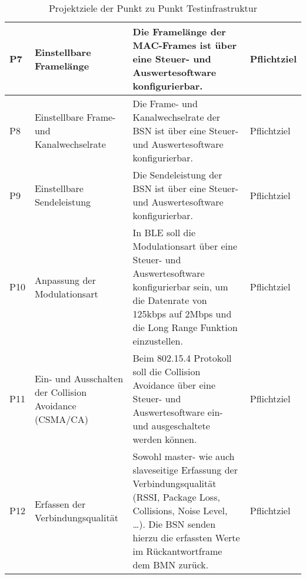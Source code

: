\begin{table}[H]
\begin{tabular}{ | C{0.7cm} | p{2.8cm} | p{8.2cm} | C{2.5cm} |}
		P7 & Einstellbare Framelänge & Die Framelänge der MAC-Frames ist über eine Steuer- und Auswertesoftware konfigurierbar. & Pflichtziel\\ \hline
		
		P8 & Einstellbare Frame- und Kanalwechselrate& Die Frame- und Kanalwechselrate der BSN ist über eine Steuer- und Auswertesoftware konfigurierbar. & Pflichtziel\\ \hline
		
		P9 & Einstellbare Sendeleistung & Die Sendeleistung der BSN ist über eine Steuer- und Auswertesoftware konfigurierbar. & Pflichtziel\\ \hline
		
		P10 & Anpassung der Modulationsart& In BLE soll die Modulationsart über eine Steuer- und Auswertesoftware konfigurierbar sein, um die Datenrate von 125kbps auf 2Mbps und die Long Range Funktion einzustellen. & Pflichtziel\\ \hline
		
		P11 & Ein- und Ausschalten der Collision Avoidance (CSMA/CA)& Beim 802.15.4 Protokoll soll die Collision Avoidance über eine Steuer- und Auswertesoftware ein- und ausgeschaltete werden können. & Pflichtziel\\ \hline
		
		P12 & Erfassen der Verbindungsqualität & Sowohl master- wie auch slaveseitige Erfassung der Verbindungsqualität (RSSI, Package Loss, Collisions, Noise Level, …). Die BSN senden hierzu die erfassten Werte im Rückantwortframe dem BMN zurück. & Pflichtziel\\ \hline
		
	\end{tabular}\\
	\caption{Projektziele der Punkt zu Punkt Testinfrastruktur}
	\label{tab:ProjektzielederPunktzuPunktTestinfrastruktur}
\end{table}


